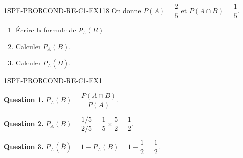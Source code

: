 

\begin{exercice}{1SPE-PROBCOND-RE-C1-EX1}{1}{8}
On donne $P(A) = \dfrac{2}{5}$ et $P(A \cap B) = \dfrac{1}{5}$.
\begin{enumerate}
  \item Écrire la formule de $P_A(B)$.
  \item Calculer $P_A(B)$.
  \item Calculer $P_A(\overline{B})$.
\end{enumerate}
\end{exercice}


\begin{corrige}{1SPE-PROBCOND-RE-C1-EX1}


\textbf{Question 1.} $P_A(B) = \dfrac{P(A \cap B)}{P(A)}$.

\textbf{Question 2.} $P_A(B) = \dfrac{1/5}{2/5} = \dfrac{1}{5} \times \dfrac{5}{2} = \dfrac{1}{2}$.

\textbf{Question 3.} $P_A(\overline{B}) = 1 - P_A(B) = 1 - \dfrac{1}{2} = \dfrac{1}{2}$.
\end{corrige}
